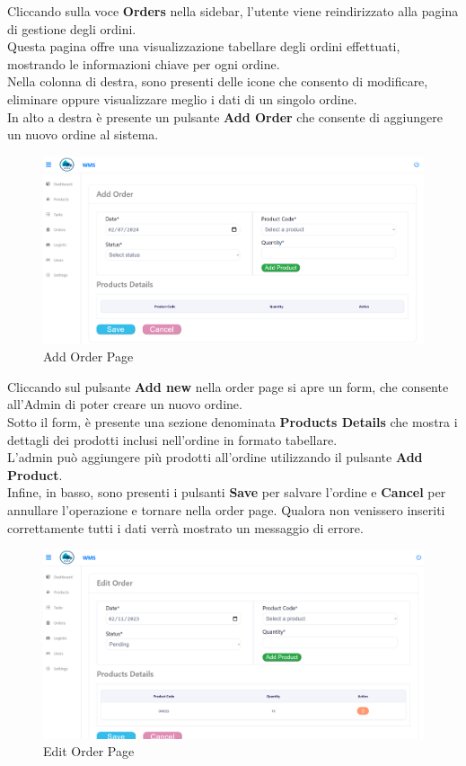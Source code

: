 Cliccando sulla voce \textbf{Orders} nella sidebar, l'utente viene reindirizzato alla pagina di gestione degli ordini.\\
Questa pagina offre una visualizzazione tabellare degli ordini effettuati,
mostrando le informazioni chiave per ogni ordine.\\
Nella colonna di destra, sono presenti delle icone che consento di modificare, eliminare oppure visualizzare meglio
i dati di un singolo ordine.\\
In alto a destra è presente un pulsante \textbf{Add Order} che consente di aggiungere un nuovo ordine al sistema.

\begin{figure}[H]
    \centering
    \includegraphics[width=\textwidth]{document/sections/img/Storyboard/addOrderPage.png}
    \caption{Add Order Page}
    \label{fig:addOrderPages}
\end{figure}

Cliccando sul pulsante \textbf{Add new} nella order page si apre un form, che consente
all'Admin di poter creare un nuovo ordine.\\
Sotto il form, è presente una sezione denominata \textbf{Products Details} che mostra i dettagli dei prodotti inclusi
nell'ordine in formato tabellare.\\
L'admin può  aggiungere più prodotti all'ordine utilizzando il pulsante \textbf{Add Product}.\\
Infine, in basso, sono presenti i pulsanti \textbf{Save} per salvare l'ordine e \textbf{Cancel} per annullare l'operazione
e tornare nella order page.
Qualora non venissero inseriti correttamente tutti i dati verrà mostrato un messaggio di errore.

\begin{figure}[H]
    \centering
    \includegraphics[width=\textwidth]{document/sections/img/Storyboard/editOrderPage.png}
    \caption{Edit Order Page}
    \label{fig:editOrderPage}
\end{figure}

